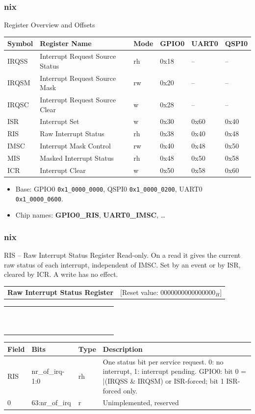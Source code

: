 \documentclass{beamer}
\makeatletter
\newcommand{\astitle}{nix}
\newcommand{\assubtitle}{nix}
\newcommand{\cmd}[1]{\texttt{#1}}
\newcommand{\asregkopf}[2]{%
{\scriptsize
\begin{tabularx}{\textwidth}{@{}Xr@{}}
  \textbf{#1} & [Reset value: {#2}]
\end{tabularx}}\par}
\newcommand{\asregfourxsixteen}[8]{%
{\tiny\setlength{\tabcolsep}{1pt}\renewcommand{\arraystretch}{0.95}%
\begin{tabularx}{\textwidth}{|*{16}{>{\centering\arraybackslash}X|}}
  \hline
  63 & 62 & 61 & 60 & 59 & 58 & 57 & 56 & 55 & 54 & 53 & 52 & 51 & 50 & 49 & 48 \\
  \hline
  #1 \\
  \hline
  #2 \\
  \hline
  \hline
  47 & 46 & 45 & 44 & 43 & 42 & 41 & 40 & 39 & 38 & 37 & 36 & 35 & 34 & 33 & 32 \\
  \hline
  #3 \\
  \hline
  #4 \\
  \hline
  \hline
  31 & 30 & 29 & 28 & 27 & 26 & 25 & 24 & 23 & 22 & 21 & 20 & 19 & 18 & 17 & 16 \\
  \hline
  #5 \\
  \hline
  #6 \\
  \hline
  \hline
  15 & 14 & 13 & 12 & 11 & 10 & 09 & 08 & 07 & 06 & 05 & 04 & 03 & 02 & 01 & 00 \\
  \hline
  #7 \\
  \hline
  #8 \\
  \hline
\end{tabularx}}\par}
\newcommand{\asregdesc}[1]{%
{\tiny\renewcommand{\arraystretch}{1.1}%
\begin{tabularx}{\dimexpr\textwidth-1.1cm\relax}{|l|l|l|Y|}
  \hline
  \textbf{Field} & \textbf{Bits} & \textbf{Type} & \textbf{Description} \\
  \hline
  #1 \\
  \hline
\end{tabularx}}\par}
\newcommand{\asrow}[1]{\multicolumn{16}{|c|}{#1}}
\makeatother
\begin{document}
\renewcommand{\assubtitle}{Register Overview and Offsets}
\begin{frame}
\frametitle{\astitle}
\begin{block}{\assubtitle}
{\scriptsize
\begin{tabularx}{\textwidth}{|l|Y|l|l|l|l|}
  \hline
  \textbf{Symbol} & \textbf{Register Name} & \textbf{Mode} & \textbf{GPIO0} & \textbf{UART0} & \textbf{QSPI0} \\
  \hline
  \hline
  IRQSS & Interrupt Request Source Status & rh & 0x18 & -- & -- \\
  \hline
  IRQSM & Interrupt Request Source Mask   & rw & 0x20 & -- & -- \\
  \hline
  IRQSC & Interrupt Request Source Clear  & w  & 0x28 & -- & -- \\
  \hline
  ISR   & Interrupt Set                   & w  & 0x30 & 0x60 & 0x40 \\
  \hline
  RIS   & Raw Interrupt Status            & rh & 0x38 & 0x40 & 0x48 \\
  \hline
  IMSC  & Interrupt Mask Control          & rw & 0x40 & 0x48 & 0x50 \\
  \hline
  MIS   & Masked Interrupt Status         & rh & 0x48 & 0x50 & 0x58 \\
  \hline
  ICR   & Interrupt Clear                 & w  & 0x50 & 0x58 & 0x60 \\
  \hline
\end{tabularx}}
\end{block}
  \begin{itemize}
    \item Base: GPIO0 \cmd{0x1\_0000\_0000}, QSPI0 \cmd{0x1\_0000\_0200}, UART0 \cmd{0x1\_0000\_0600}.
    \item Chip names: \textbf{GPIO0\_RIS}, \textbf{UART0\_IMSC}, \ldots
  \end{itemize}
\end{frame}

\renewcommand{\assubtitle}{RIS -- Raw Interrupt Status Register}
\begin{frame}
\frametitle{\astitle}
\begin{block}{\assubtitle}
{\tiny Read-only. On a read it gives the current raw status of each interrupt,
independent of IMSC. Set by an event or by ISR, cleared by ICR. A write has no effect.}
\vspace{2pt}
\asregkopf{Raw Interrupt Status Register}{$0000000000000000_H$}
\asregfourxsixteen{\asrow{0}}{\asrow{r}}
                  {\asrow{0}}{\asrow{r}}
                  {\asrow{0}}{\asrow{r}}
                  {\multicolumn{16}{|c|}{0 / RIS}}{\multicolumn{16}{|c|}{r / rh}}
\vspace{2pt}
\asregdesc{RIS & nr\_of\_irq-1:0 & rh & One status bit per service request. 0: no interrupt, 1: interrupt pending. GPIO0: bit 0 = |(IRQSS \& IRQSM) or ISR-forced; bit 1 ISR-forced only. \\
           \hline
           0 & 63:nr\_of\_irq & r & Unimplemented, reserved}
\end{block}
\end{frame}
\end{document}
